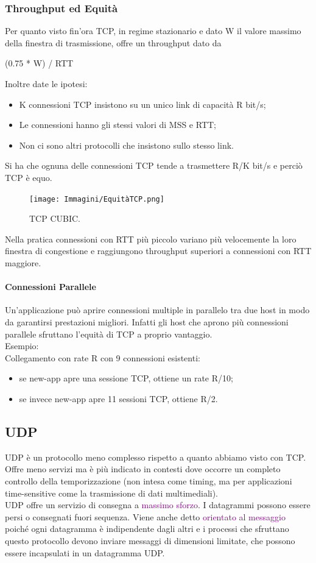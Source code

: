 \subsubsection{Throughput ed Equità}
Per quanto visto fin'ora TCP, in regime stazionario e dato W il valore massimo della finestra di trasmissione, offre un throughput dato da 
\begin{center}
    (0.75 * W) / RTT
\end{center}
Inoltre date le ipotesi:
\begin{itemize}
    \item K connessioni TCP insistono su un unico link di capacità R bit/s;
    \item Le connessioni hanno gli stessi valori di MSS e RTT;
    \item Non ci sono altri protocolli che insistono sullo stesso link.
\end{itemize}
Si ha che ognuna delle connessioni TCP tende a trasmettere R/K bit/s e perciò TCP è equo.
\begin{figure}[h]
    \centering
    \texttt{[image: Immagini/EquitàTCP.png]}
    \caption{TCP CUBIC.}
\end{figure}

Nella pratica connessioni con RTT più piccolo variano più velocemente la loro finestra di congestione e raggiungono throughput superiori a connessioni con RTT maggiore.

\paragraph{Connessioni Parallele}
Un’applicazione può aprire connessioni multiple in parallelo tra due host in modo da garantirsi prestazioni migliori. Infatti gli host che aprono più connessioni parallele sfruttano l'equità di TCP a proprio vantaggio.
\\Esempio:
\\Collegamento con rate R con 9 connessioni esistenti:
\begin{itemize}
    \item se new-app apre una sessione TCP, ottiene un rate R/10;
    \item se invece new-app apre 11 sessioni TCP, ottiene R/2.
\end{itemize}

\subsection{UDP}
UDP è un protocollo meno complesso rispetto a quanto abbiamo visto con TCP. 
Offre meno servizi ma è più indicato in contesti dove occorre un completo controllo della temporizzazione (non intesa come timing, ma per applicazioni time-sensitive come la trasmissione di dati multimediali).
\\UDP offre un servizio di consegna a \textcolor{purple}{massimo sforzo}. I datagrammi possono essere persi o consegnati fuori sequenza. 
Viene anche detto \textcolor{purple}{orientato al messaggio} poiché ogni datagramma è indipendente dagli altri e i processi che sfruttano questo protocollo devono inviare messaggi di dimensioni limitate, che possono essere incapsulati in un datagramma UDP.

